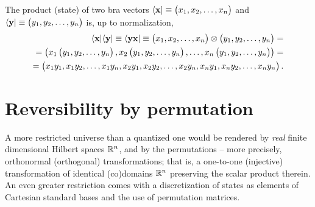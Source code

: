 The product (state) of two bra vectors
$\langle   {\bf x}  \vert
\equiv
\begin{pmatrix}
x_1,
x_2,
\ldots ,
x_n
\end{pmatrix}
$
and
$\langle   {\bf y}  \vert
\equiv
\begin{pmatrix}
y_1,
y_2,
\ldots ,
y_n
\end{pmatrix}
$
is, up to normalization,
\begin{equation}
\begin{split}
\langle   {\bf x}  \vert  \langle   {\bf y}  \vert
\equiv \langle {\bf y} {\bf x}\vert
\equiv
\begin{pmatrix}
x_1,
x_2,
\ldots ,
x_n
\end{pmatrix}
\otimes
 \begin{pmatrix}
y_1,
y_2,
\ldots ,
y_n
\end{pmatrix}
=\\
=
\begin{pmatrix}
x_1
\begin{pmatrix}
y_1,
y_2,
\ldots ,
y_n
\end{pmatrix}
,
x_2
\begin{pmatrix}
y_1,
y_2,
\ldots ,
y_n
\end{pmatrix} ,
\ldots          ,
x_n  \begin{pmatrix}
y_1,
y_2,
\ldots ,
y_n
\end{pmatrix}
\end{pmatrix}
=\\
=
\begin{pmatrix}
x_1y_1,
x_1y_2,
\ldots ,
x_1y_n  ,
x_2 y_1,
x_2y_2,
\ldots ,
x_2y_n  ,
x_ny_1,
x_ny_2,
\ldots ,
x_ny_n
\end{pmatrix} .
\end{split}
\end{equation}



\section{Reversibility by permutation}
\label{2016-pu-book-chapter-permut} %
\label{2016-pu-book-chapter-rp} %

A more restricted universe than a quantized one would be rendered by {\em real}
finite dimensional Hilbert spaces ${\Bbb R}^n$, and by the permutations
-- more precisely, orthonormal (orthogonal) transformations; that is,  a one-to-one (injective) transformation of identical (co)domains ${\Bbb R}^n$
preserving the scalar product therein.
An even greater restriction comes with a discretization of states as elements of Cartesian standard bases and the use of permutation matrices.

